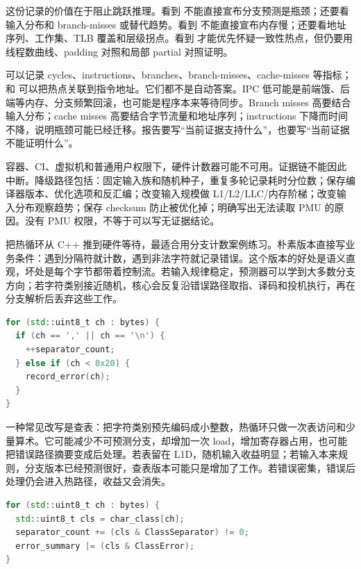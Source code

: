 这份记录的价值在于阻止跳跃推理。看到  不能直接宣布分支预测是瓶颈；还要看输入分布和 branch-misses 或替代趋势。看到  不能直接宣布内存慢；还要看地址序列、工作集、TLB 覆盖和层级拐点。看到  才能优先怀疑一致性热点，但仍要用线程数曲线、padding 对照和局部 partial 对照证明。

 可以记录 cycles、instructions、branches、branch-misses、cache-misses 等指标； 和  可以把热点关联到指令地址。它们都不是自动答案。IPC 低可能是前端饿、后端等内存、分支频繁回滚，也可能是程序本来等待同步。Branch misses 高要结合输入分布；cache misses 高要结合字节流量和地址序列；instructions 下降而时间不降，说明瓶颈可能已经迁移。报告要写“当前证据支持什么”，也要写“当前证据不能证明什么”。

容器、CI、虚拟机和普通用户权限下，硬件计数器可能不可用。证据链不能因此中断。降级路径包括：固定输入族和随机种子，重复多轮记录耗时分位数；保存编译器版本、优化选项和反汇编；改变输入规模做 L1/L2/LLC/内存阶梯；改变输入分布观察趋势；保存 checksum 防止被优化掉；明确写出无法读取 PMU 的原因。没有 PMU 权限，不等于可以写无证据结论。

把热循环从 C++ 推到硬件等待，最适合用分支计数案例练习。朴素版本直接写业务条件：遇到分隔符就计数，遇到非法字符就记录错误。这个版本的好处是语义直观，坏处是每个字节都带着控制流。若输入规律稳定，预测器可以学到大多数分支方向；若字符类别接近随机，核心会反复沿错误路径取指、译码和投机执行，再在分支解析后丢弃这些工作。

\begin{lstlisting}[language=C++,caption={分支版本保留了最直接的语义}]
for (std::uint8_t ch : bytes) {
  if (ch == ',' || ch == '\n') {
    ++separator_count;
  } else if (ch < 0x20) {
    record_error(ch);
  }
}
\end{lstlisting}

一种常见改写是查表：把字符类别预先编码成小整数，热循环只做一次表访问和少量算术。它可能减少不可预测分支，却增加一次 load，增加寄存器占用，也可能把错误路径摘要变成后处理。若表留在 L1D，随机输入收益明显；若输入本来规则，分支版本已经预测很好，查表版本可能只是增加了工作。若错误密集，错误后处理仍会进入热路径，收益又会消失。

\begin{lstlisting}[language=C++,caption={查表版本把控制流转成数据流}]
for (std::uint8_t ch : bytes) {
  std::uint8_t cls = char_class[ch];
  separator_count += (cls & ClassSeparator) != 0;
  error_summary |= (cls & ClassError);
}
\end{lstlisting}


